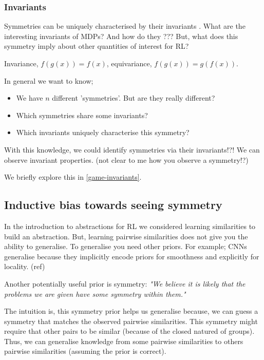 \subsubsection{Invariants}

Symmetries can be uniquely characterised by their invariants \cite{PeterOlver1999}.
What are the interesting invariants of MDPs? And how do they ???
But, what does this symmetry imply about other quantities of interest for RL?

Invariance, $f(g(x)) = f(x)$, equivariance, $f(g(x)) = g(f(x))$.

In general we want to know;

\begin{itemize}
	\tightlist
	\item We have $n$ different 'symmetries'. But are they really different?
	\item Which symmetries share some invariants?
	\item Which invariants uniquely characterise this symmetry?
\end{itemize}

With this knowledge, we could identify symmetries via their invariants!?!
We can observe invariant properties. (not clear to me how you observe a symmetry!?)

We briefly explore this in \ref{game-invariants}.


\subsection{Inductive bias towards seeing symmetry}

In the introduction to abstractions for RL we considered learning similarities
to build an abstraction. But, learning pairwise similarities does not give
you the ability to generalise. To generalise you need other priors. For example;
CNNs generalise because they implicitly encode priors for smoothness and explicitly for locality. (ref)

Another potentially useful prior is symmetry: \textit{"We believe it is likely that
the problems we are given have some symmetry within them."}

The intuition is, this symmetry prior helps us generalise because, we can guess
a symmetry that matches the observed pairwise similarities. This symmetry might
require that other pairs to be similar (because of the closed natured of groups).
Thus, we can generalise knowledge from some pairwise similarities to others
pairwise similarities (assuming the prior is correct).

